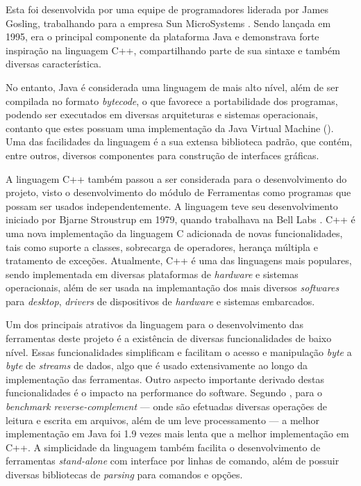 Esta foi desenvolvida por uma equipe de programadores liderada por James Gosling, trabalhando para a empresa Sun MicroSystems \cite{wikijava}. Sendo lançada em 1995, era o principal componente da plataforma Java e demonstrava forte inspiração na linguagem C++, compartilhando parte de sua sintaxe e também diversas característica.

No entanto, Java é considerada uma linguagem de mais alto nível, além de ser compilada no formato \emph{bytecode}, o que favorece a portabilidade dos programas, podendo ser executados em diversas arquiteturas e sistemas operacionais, contanto que estes possuam uma implementação da Java Virtual Machine (). Uma das facilidades da linguagem é a sua extensa biblioteca padrão, que contém, entre outros, diversos componentes para construção de interfaces gráficas.

A linguagem C++ também passou a ser considerada para o desenvolvimento do projeto, visto o desenvolvimento do módulo de Ferramentas como programas que possam ser usados independentemente.
A linguagem teve seu desenvolvimento iniciado por Bjarne Stroustrup em 1979, quando trabalhava na Bell Labs \cite{wikicplusplus}.
C++ é uma nova implementação da linguagem C adicionada de novas funcionalidades, tais como suporte a classes, sobrecarga de operadores, herança múltipla e tratamento de exceções.
Atualmente, C++ é uma das linguagens mais populares, sendo implementada em diversas plataformas de \emph{hardware} e sistemas operacionais, além de ser usada na implemantação dos mais diversos \emph{softwares} para \emph{desktop}, \emph{drivers} de dispositivos de \emph{hardware} e sistemas embarcados.

Um dos principais atrativos da linguagem para o desenvolvimento das ferramentas deste projeto é a existência de diversas funcionalidades de baixo nível.
Essas funcionalidades simplificam e facilitam o acesso e manipulação \emph{byte} a \emph{byte} de \emph{streams} de dados, algo que é usado extensivamente ao longo da implementação das ferramentas.
Outro aspecto importante derivado destas funcionalidades é o impacto na performance do software. 
Segundo \cite{benchmarks}, para o \emph{benchmark reverse-complement} --- onde são efetuadas diversas operações de leitura e escrita em arquivos, além de um leve processamento --- a melhor implementação em Java foi 1.9 vezes mais lenta que a melhor implementação em C++.
A simplicidade da linguagem também facilita o desenvolvimento de ferramentas \emph{stand-alone} com interface por linhas de comando, além de possuir diversas bibliotecas de \emph{parsing} para comandos e opções.

